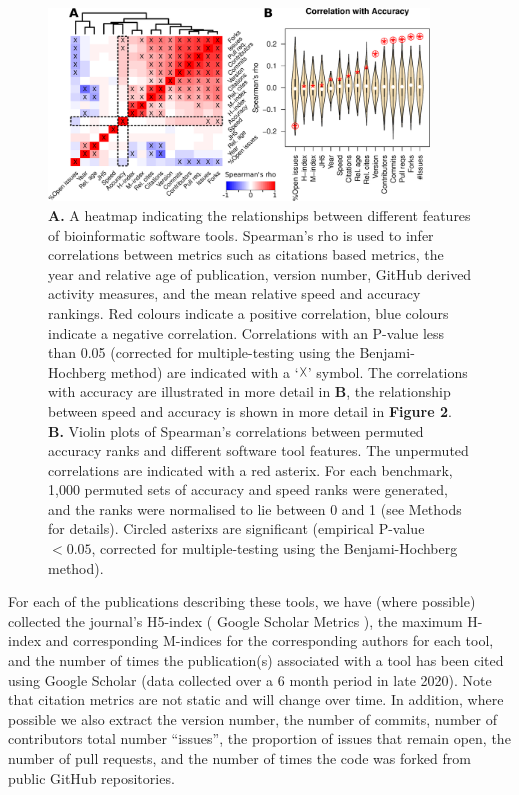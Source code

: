 \documentclass{bmcart}
\begin{document}
\begin{figure}[htb!]
\includegraphics[width=0.9\textwidth]{figure1.pdf}
\caption{\textbf{A.} A heatmap indicating the relationships between
  different features of bioinformatic software tools. Spearman’s rho is used to
  infer correlations between metrics such as citations based metrics, the year and relative age of publication, 
  version number, GitHub derived activity measures, and 
  the mean
  relative speed and accuracy rankings. Red colours
  indicate a positive correlation, blue colours indicate a negative
  correlation. Correlations with an P-value less than 0.05 (corrected for multiple-testing using the Benjami-Hochberg method) are
  indicated with a `$\vartimes$' symbol. The correlations with accuracy are illustrated in
  more detail in \textbf{B}, the relationship between speed and
  accuracy is shown in more detail in \textbf{Figure 2}.
  \textbf{B.} Violin plots of Spearman's correlations between permuted accuracy ranks and 
    different software tool features. 
    The unpermuted correlations are indicated with a red asterix.
    For each benchmark, 1,000 permuted sets of accuracy and speed ranks were generated, and the ranks were normalised to lie between 0 and 1 (see Methods for details).
  Circled asterixs are significant (empirical P-value $< 0.05$, corrected for multiple-testing using the Benjami-Hochberg method).}
\label{fig:allfactors}
\end{figure}

For each of the publications describing these tools, we have (where
possible) collected the journal's H5-index (
Google Scholar Metrics
), the maximum H-index and
corresponding M-indices \cite{Hirsch2005-mt} for the corresponding
authors for each tool, and the number of times the publication(s)
associated with a tool has been cited using Google Scholar (data
collected over a 6 month period in late 2020). Note that citation metrics
are not static and will change over time. In addition, where possible we also extract the version number, the number
of commits, number of contributors
{\color{red} total number ``issues'', the proportion of issues that remain open, the number of pull requests, and the number of times the code was forked}
from public GitHub repositories.  
\end{document}
